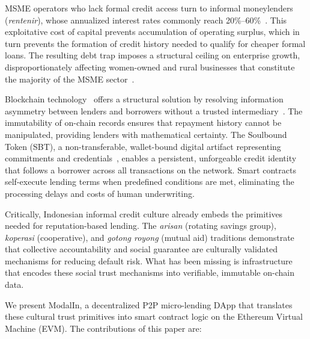 \documentclass[conference]{IEEEtran}
\begin{document}
MSME operators who lack formal credit access turn to informal moneylenders
(\textit{rentenir}), whose annualized interest rates commonly reach
20\%--60\%~\cite{b9}. This exploitative cost of capital prevents accumulation
of operating surplus, which in turn prevents the formation of credit history
needed to qualify for cheaper formal loans. The resulting debt trap imposes a
structural ceiling on enterprise growth, disproportionately affecting
women-owned and rural businesses that constitute the majority of the MSME
sector~\cite{b17}.

Blockchain technology~\cite{b11,b18} offers a structural solution by resolving
information asymmetry between lenders and borrowers without a trusted
intermediary~\cite{b4}. The immutability of on-chain records ensures that
repayment history cannot be manipulated, providing lenders with mathematical
certainty. The Soulbound Token (SBT), a non-transferable, wallet-bound digital
artifact representing commitments and credentials~\cite{b1,b2}, enables a
persistent, unforgeable credit identity that follows a borrower across all
transactions on the network. Smart contracts~\cite{b19} self-execute lending
terms when predefined conditions are met, eliminating the processing delays
and costs of human underwriting.

Critically, Indonesian informal credit culture already embeds the primitives
needed for reputation-based lending. The \textit{arisan} (rotating savings
group), \textit{koperasi} (cooperative), and \textit{gotong royong} (mutual
aid) traditions demonstrate that collective accountability and social guarantee
are culturally validated mechanisms for reducing default risk. What has been
missing is infrastructure that encodes these social trust mechanisms into
verifiable, immutable on-chain data.

We present ModalIn, a decentralized P2P micro-lending DApp that translates
these cultural trust primitives into smart contract logic on the Ethereum
Virtual Machine (EVM). The contributions of this paper are:
\end{document}
